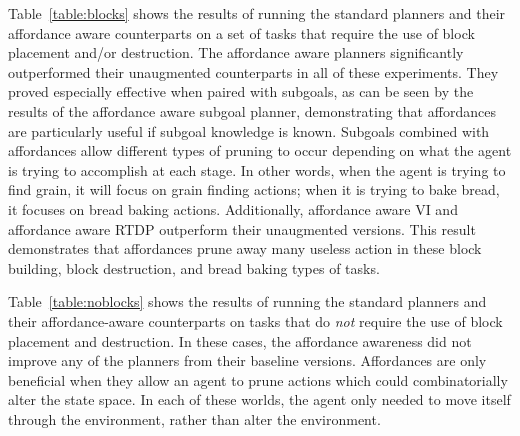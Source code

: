 \documentclass[]{article}
\newcommand{\stnote}[1]{\textcolor{Blue}{\textbf{ST: #1}}}
\newcommand{\dnote}[1]{\textcolor{Orange}{\textbf{D: #1}}}
\begin{document}
Table~\ref{table:blocks} shows the results of running the standard
planners and their affordance aware counterparts on a set of tasks
that require the use of block placement and/or destruction.  The
affordance aware planners significantly outperformed their unaugmented
counterparts in all of these experiments. They proved
especially effective when paired with subgoals, as can be seen by the
results of the affordance aware subgoal planner, demonstrating that
affordances are particularly useful if subgoal knowledge is known.
Subgoals combined with affordances allow different types of pruning to
occur depending on what the agent is trying to accomplish at each
stage. In other words, when the agent is trying to find grain, it will
focus on grain finding actions; when it is trying to bake bread, it
focuses on bread baking actions.  Additionally, affordance aware VI
and affordance aware RTDP outperform their unaugmented versions.  This
result demonstrates that affordances prune away many useless action in
these block building, block destruction, and bread baking types of
tasks.

Table~\ref{table:noblocks} shows the results of running the standard
planners and their affordance-aware counterparts on tasks that do {\it
  not} require the use of block placement and destruction.  In these
cases, the affordance awareness did not improve any of the planners
from their baseline versions. Affordances are only beneficial when
they allow an agent to prune actions which could combinatorially alter
the state space. In each of these worlds, the agent only needed to
move itself through the environment, rather than alter the
environment.  

\end{document}
